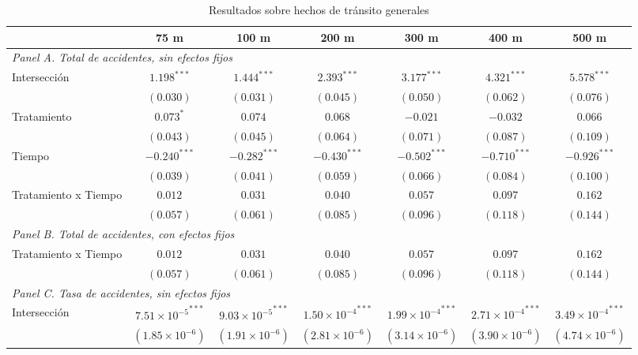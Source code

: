 \begin{table}[htbp]
    \centering
    \caption{Resultados sobre hechos de tránsito generales}
    \label{tab:results-main-general}
    \footnotesize
    \begin{adjustbox}{max width=\textwidth}
    \begin{tabular}{lcccccc}
        \toprule
        & 75 m & 100 m & 200 m & 300 m & 400 m & 500 m \\
        \midrule
        \multicolumn{7}{l}{\textit{Panel A. Total de accidentes, sin efectos fijos}} \\
        Intersección & $1.198^{***}$ & $1.444^{***}$ & $2.393^{***}$ & $3.177^{***}$ & $4.321^{***}$ & $5.578^{***}$ \\
         & $(0.030)$ & $(0.031)$ & $(0.045)$ & $(0.050)$ & $(0.062)$ & $(0.076)$ \\
        Tratamiento & $0.073^{*}$ & $0.074$ & $0.068$ & $-0.021$ & $-0.032$ & $0.066$ \\
         & $(0.043)$ & $(0.045)$ & $(0.064)$ & $(0.071)$ & $(0.087)$ & $(0.109)$ \\
        Tiempo & $-0.240^{***}$ & $-0.282^{***}$ & $-0.430^{***}$ & $-0.502^{***}$ & $-0.710^{***}$ & $-0.926^{***}$ \\
         & $(0.039)$ & $(0.041)$ & $(0.059)$ & $(0.066)$ & $(0.084)$ & $(0.100)$ \\
        Tratamiento x Tiempo & $0.012$ & $0.031$ & $0.040$ & $0.057$ & $0.097$ & $0.162$ \\
         & $(0.057)$ & $(0.061)$ & $(0.085)$ & $(0.096)$ & $(0.118)$ & $(0.144)$ \\
        \midrule
        \multicolumn{7}{l}{\textit{Panel B. Total de accidentes, con efectos fijos}} \\
        Tratamiento x Tiempo & $0.012$ & $0.031$ & $0.040$ & $0.057$ & $0.097$ & $0.162$ \\
         & $(0.057)$ & $(0.061)$ & $(0.085)$ & $(0.096)$ & $(0.118)$ & $(0.144)$ \\
        \midrule
        \multicolumn{7}{l}{\textit{Panel C. Tasa de accidentes, sin efectos fijos}} \\
        Intersección & $7.51 \times {10^{-5}}^{***}$ & $9.03 \times {10^{-5}}^{***}$ & $1.50 \times {10^{-4}}^{***}$ & $1.99 \times {10^{-4}}^{***}$ & $2.71 \times {10^{-4}}^{***}$ & $3.49 \times {10^{-4}}^{***}$ \\
         & $(1.85 \times 10^{-6})$ & $(1.91 \times 10^{-6})$ & $(2.81 \times 10^{-6})$ & $(3.14 \times 10^{-6})$ & $(3.90 \times 10^{-6})$ & $(4.74 \times 10^{-6})$ \\

\end{tabular}
\end{adjustbox}
\end{table}
